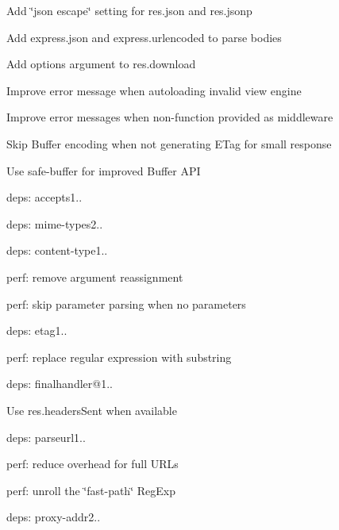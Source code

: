 \begin{DoxyItemize}
\item Add {\ttfamily \char`\"{}json escape\char`\"{}} setting for {\ttfamily res.\+json} and {\ttfamily res.\+jsonp}
\item Add {\ttfamily express.\+json} and {\ttfamily express.\+urlencoded} to parse bodies
\item Add {\ttfamily options} argument to {\ttfamily res.\+download}
\item Improve error message when autoloading invalid view engine
\item Improve error messages when non-\/function provided as middleware
\item Skip {\ttfamily Buffer} encoding when not generating E\+Tag for small response
\item Use {\ttfamily safe-\/buffer} for improved Buffer A\+PI
\item deps\+: accepts1..
\begin{DoxyItemize}
\item deps\+: mime-\/types2..
\end{DoxyItemize}
\item deps\+: content-\/type1..
\begin{DoxyItemize}
\item perf\+: remove argument reassignment
\item perf\+: skip parameter parsing when no parameters
\end{DoxyItemize}
\item deps\+: etag1..
\begin{DoxyItemize}
\item perf\+: replace regular expression with substring
\end{DoxyItemize}
\item deps\+: finalhandler@1..
\begin{DoxyItemize}
\item Use {\ttfamily res.\+headers\+Sent} when available
\end{DoxyItemize}
\item deps\+: parseurl1..
\begin{DoxyItemize}
\item perf\+: reduce overhead for full U\+R\+Ls
\item perf\+: unroll the \char`\"{}fast-\/path\char`\"{} {\ttfamily Reg\+Exp}
\end{DoxyItemize}
\item deps\+: proxy-\/addr2..
\begin{DoxyItemize}

\end{DoxyItemize}
\end{DoxyItemize}
